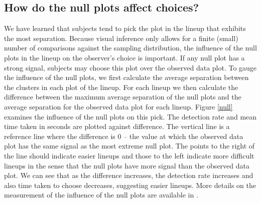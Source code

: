 \subsection{How do the null plots affect choices?}

We have learned that subjects tend to pick the plot in the lineup that exhibits the most separation.  Because visual inference only allows for a finite (small) number of comparisons against the sampling distribution, the influence of the null plots in the lineup on the observer's choice is important. If any null plot has a strong signal, subjects may choose this plot over the observed data plot. To gauge the influence of the null plots, we first calculate the average separation between the clusters in each plot of the lineup. For each lineup we then calculate the difference between the maximum average separation of the null plots and the average separation for the observed data plot for each lineup. Figure \ref{null} examines the influence of the null plots on this pick. The detection rate and mean time taken in seconds are plotted against difference. The vertical line is a reference line where the difference is 0 -- the value at which the observed data plot has the same signal as the most extreme null plot. The points to the right of the line should indicate easier lineups and those to the left indicate more difficult lineups in the sense that the null plots have more signal than the observed data plot. We can see that as the difference increases, the detection rate increases and also time taken to choose decreases, suggesting easier lineups. More details on the measurement of the influence of the null plots are available in \cite{roychowdhury:2012}.

